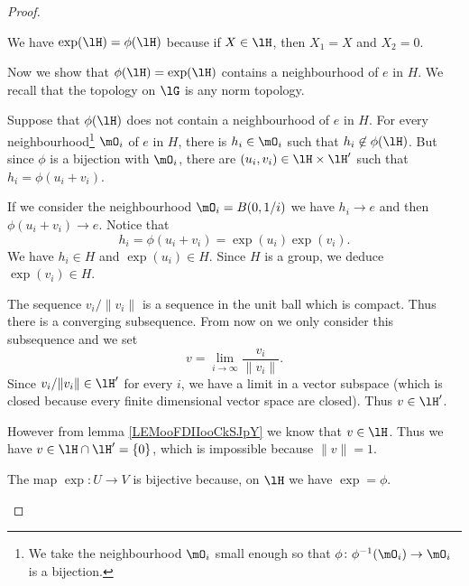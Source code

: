 \begin{proof}
\begin{subproof}
		\spitem[Image]
		We have \( \exp(\lH)=\phi(\lH)\) because if \( X\in \lH\), then \( X_1=X\) and \( X_2=0\).


		Now we show that \( \phi(\lH)=\exp(\lH)\) contains a neighbourhood of \( e\) in \( H\). We recall that the topology on \( \lG\) is any norm topology.

		Suppose that \( \phi(\lH)\) does not contain a neighbourhood of \( e\) in \( H\). For every neighbourhood\footnote{We take the neighbourhood \( \mO_i\) small enough so that \(\phi \colon \phi^{-1}(\mO_i)\to \mO_i  \) is a bijection.} \( \mO_i\) of \( e\) in \( H\), there is \( h_i\in\mO_i\) such that \( h_i\not\in\phi(\lH)\). But since \( \phi\) is a bijection with \( \mO_i\), there are \( (u_i,v_i)\in\lH\times \lH'\) such that \( h_i=\phi(u_i+v_i)\).

		If we consider the neighbourhood \( \mO_i=B(0,1/i)\) we have \( h_i\to e\) and then \( \phi(u_i+v_i)\to e\). Notice that
		\begin{equation}
			h_i=\phi(u_i+v_i)=\exp(u_i)\exp(v_i).
		\end{equation}
		We have \( h_i\in H\) and \( \exp(u_i)\in H\). Since \( H\) is a group, we deduce \( \exp(v_i)\in H\).

		The sequence \( v_i/\| v_i \|\) is a sequence in the unit ball which is compact. Thus there is a converging subsequence. From now on we only consider this subsequence and we set
		\begin{equation}
			v=\lim_{i\to \infty}\frac{ v_i }{ \| v_i \| }.
		\end{equation}
		Since \( v_i/\| v_i \|\in \lH'\) for every \( i\), we have a limit in a vector subspace (which is closed because every finite dimensional vector space are closed). Thus \( v\in \lH'\).

		However from lemma \ref{LEMooFDIIooCkSJpY} we know that \( v\in\lH\). Thus we have \( v\in\lH\cap\lH'=\{ 0 \}\), which is impossible because \( \| v \|=1\).

		\spitem[Conclusion]

		The map \( \exp\colon U\to V\) is bijective because, on \( \lH\) we have \( \exp=\phi\).

	\end{subproof}
\end{proof}

